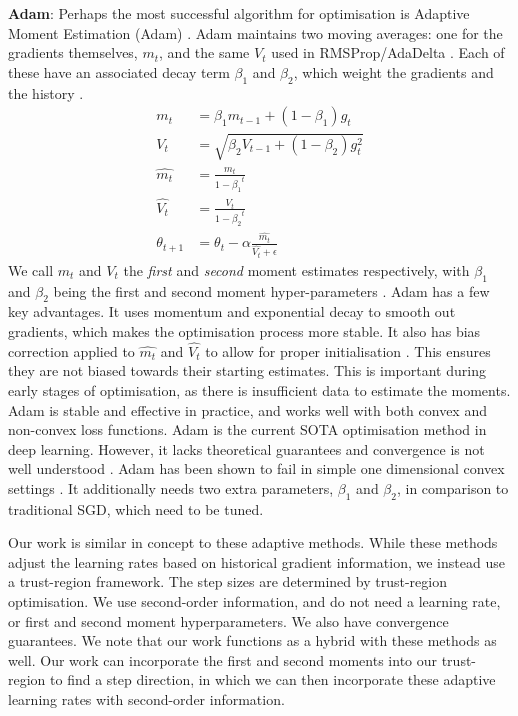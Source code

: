 \textbf{Adam}: Perhaps the most successful algorithm for optimisation is Adaptive Moment Estimation (Adam) \citep{kingma2014adam}. Adam maintains two moving averages: one for the gradients themselves, $m_t$, and the same $V_t$ used in RMSProp/AdaDelta \citep{kingma2014adam}. Each of these have an associated decay term $\beta_1$ and $\beta_2$, which weight the gradients and the history \citep{kingma2014adam}.
\begin{align}
m_t &= \beta_1 m_{t-1} + (1 - \beta_1) g_t \label{eq:m_t} \\
V_t &= \sqrt{\beta_2 V_{t-1} + (1 - \beta_2) g_t^2} \\
\hat{m_t} &= \frac{m_t}{1 - {\beta_1}^t} \\
\hat{V_t} &= \frac{V_t}{1 - {\beta_2}^t} \\
\theta_{t+1} &= \theta_t - \alpha \frac{\hat{m_t}}{{\hat{V_t}} + \epsilon} \label{eq:adam_update}
\end{align}
We call $m_t$ and $V_t$ the \textit{first} and \textit{second} moment estimates respectively, with $\beta_1$ and $\beta_2$ being the first and second moment hyper-parameters \citep{kingma2014adam}. Adam has a few key advantages. It uses momentum and exponential decay to smooth out gradients, which makes the optimisation process more stable. It also has bias correction applied to $\hat{m_t}$ and $\hat{V_t}$ to allow for proper initialisation \citep{kingma2014adam}. This ensures they are not biased towards their starting estimates. This is important during early stages of optimisation, as there is insufficient data to estimate the moments. Adam is stable and effective in practice, and works well with both convex and non-convex loss functions. Adam is the current SOTA optimisation method in deep learning. However, it lacks theoretical guarantees and convergence is not well understood \citep{reddi2019asmgrad}. Adam has been shown to fail in simple one dimensional convex settings \citep{reddi2019asmgrad}. It additionally needs two extra parameters, $\beta_1$ and $\beta_2$, in comparison to traditional SGD, which need to be tuned.

Our work is similar in concept to these adaptive methods. While these methods adjust the learning rates based on historical gradient information, we instead use a trust-region framework. The step sizes are determined by trust-region optimisation. We use second-order information, and do not need a learning rate, or first and second moment hyperparameters. We also have convergence guarantees. We note that our work functions as a hybrid with these methods as well. Our work can incorporate the first and second moments into our trust-region to find a step direction, in which we can then incorporate these adaptive learning rates with second-order information. 


